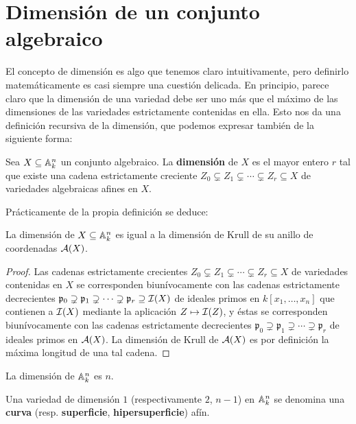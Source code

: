 \documentclass[ACGA.tex]{subfiles}
\begin{document}
\section{Dimensión de un conjunto algebraico}

El concepto de dimensión es algo que tenemos claro intuitivamente, pero definirlo matemáticamente es casi siempre una cuestión delicada. En principio, parece claro que la dimensión de una variedad debe ser uno más que el máximo de las dimensiones de las variedades estrictamente contenidas en ella. Esto nos da una definición recursiva de la dimensión, que podemos expresar también de la siguiente forma:

\begin{defi} Sea $X\subseteq \mathbb{A}^n_k$ un conjunto algebraico. La {\bf dimensión} de $X$ es el mayor entero $r$ tal que existe una cadena estrictamente creciente $Z_0\subsetneq Z_1\subsetneq \cdots\subsetneq Z_r\subseteq X$ de variedades algebraicas afines en $X$.

\end{defi}

Prácticamente de la propia definición se deduce:

\begin{prop}
La dimensión de $X\subseteq \mathbb{A}^n_k$ es igual a la dimensión de Krull de su anillo de coordenadas ${\mathcal A}(X)$. 
\end{prop}

\begin{proof}
 Las cadenas estrictamente crecientes $Z_0\subsetneq Z_1\subsetneq \cdots\subsetneq Z_r\subseteq X$ de variedades contenidas en $X$ se corresponden biunívocamente con las cadenas estrictamente decrecientes ${\mathfrak p}_0\supsetneq{\mathfrak p}_1\supsetneq\cdots\supsetneq{\mathfrak p}_r\supseteq \mathcal{I}(X)$ de ideales primos en $k[x_1,\ldots,x_n]$ que contienen a $\mathcal{I}(X)$ mediante la aplicación $Z\mapsto\mathcal{I}(Z)$, y éstas se corresponden biunívocamente con las cadenas estrictamente decrecientes ${\mathfrak p}_0\supsetneq{\mathfrak p}_1\supsetneq\cdots\supsetneq{\mathfrak p}_r$ de ideales primos en ${\mathcal A}(X)$. La dimensión de Krull de ${\mathcal A}(X)$ es por definición la máxima longitud de una tal cadena.
\end{proof}

\begin{coro}
 La dimensión de $\mathbb{A}^n_k$ es $n$.
\end{coro}

\begin{defi}
 Una variedad de dimensión $1$ (respectivamente $2$, $n-1$) en $\mathbb{A}^n_k$ se denomina una {\bf curva} (resp. {\bf superficie}, {\bf hipersuperficie}) afín.
\end{defi}
\end{document}
